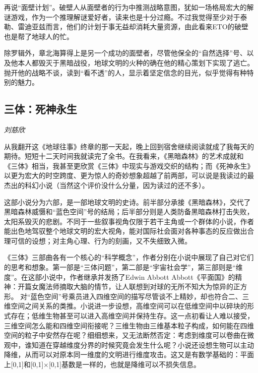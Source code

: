 \par 再说“面壁计划”。破壁人从面壁者的行为中推测战略意图，犹如一场格局宏大的解谜游戏，作为一个推理解谜爱好者，读来也是十分过瘾。不过我觉得至少对于泰勒、雷迪亚兹而言，他们的计划于事无益却消耗大量资源，由此看来ETO的破壁也是帮了地球人的忙。
\par 除罗辑外，章北海算得上是另一个成功的面壁者，尽管他保全的“自然选择”号、以及他本人都毁灭于黑暗战役，地球文明的火种的确在他的精心策划下实现了逃亡。抛开他的战略不谈，读到“看不透”的人，显示着坚定信念的目光，似乎觉得有种特别的魅力。
\par {}

\subsection*{三体：死神永生}
\par \emph{刘慈欣} 
\par 从我翻开这《地球往事》终章的那一天起，晚上回到宿舍继续阅读就成了我每天的期待。短短十二天时间我就读完了全书。在我看来，《黑暗森林》的艺术成就和《三体》相当，我甚至更欣赏《三体》中现实与游戏交织的结构；而《死神永生》以更为宏大的时空跨度、更为惊人的奇妙想象超越了前两部，可以说是我读过的最杰出的科幻小说（当然这个评价没什么分量，因为读过的还不多）。
\par 这部小说分为六部，是一部地球文明的史诗。前半部分承接《黑暗森林》，交代了黑暗森林威慑和“蓝色空间”号的结局；后半部分则是人类防备黑暗森林打击失败，太阳系毁灭的悲剧。不同于一些叙事视角仅限于若干主角或一个群体的小说，作者能出色地驾驭整个地球文明的宏大视角，能对国际社会面对各种事态的反应做出合理可信的设想；对主角心理、行为的刻画，又不失细致入微。
\par 《三体》三部曲各有一个核心的“科学概念”，作者分别在小说中展现了自己对它们的思考和想象。第一部是“三体问题”，第二部是“宇宙社会学”，第三部则是“维度”。在这部小说中，作者继承并发扬了Edwin Abbott Abbott《平面国》的精神：开篇女魔法师摘取大脑的情节，让人联想到对球的无所不知大为惊异的正方形。 对“蓝色空间”号乘员进入四维空间的描写尽管谈不上精妙，却也符合二、三维空间之间关系的类推。小说进一步设想，高维空间可以在低维空间中以碎块的形式存在；低维生物甚至可以进入高维空间并保持生存。这一点初看让人难以接受，三维空间怎么能和四维空间衔接呢？三维生物由三维基本粒子构成，如何能在四维空间的粒子中安然存在呢？细细想来，又无法断然否定：考虑到维度可以卷曲在微观中，谁知道在穿越维度分界的时候究竟会发生什么呢？小说还设想生物可以主动降维，从而可以对原本同一维度的文明进行维度攻击。这又是有数学基础的：平面上[0,1]和[0,1]×[0,1]基数是一样的，也就是降维可以不损失信息。
